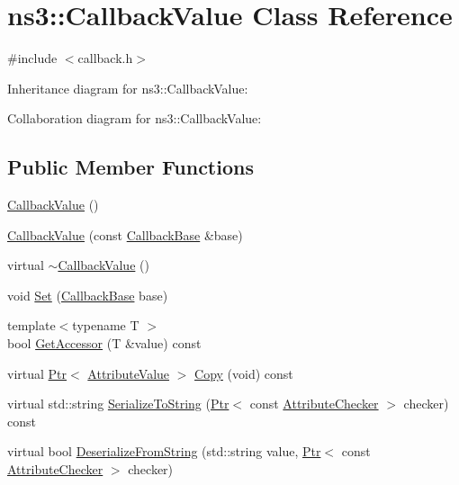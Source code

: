 \hypertarget{classns3_1_1CallbackValue}{}\section{ns3\+:\+:Callback\+Value Class Reference}
\label{classns3_1_1CallbackValue}


{\ttfamily \#include $<$callback.\+h$>$}



Inheritance diagram for ns3\+:\+:Callback\+Value\+:


Collaboration diagram for ns3\+:\+:Callback\+Value\+:
\subsection*{Public Member Functions}
\begin{DoxyCompactItemize}
\item 
\hyperlink{classns3_1_1CallbackValue_a7c4de477fc1d87150302ecbac49e47f8}{Callback\+Value} ()
\item 
\hyperlink{classns3_1_1CallbackValue_af14c204e8277d802245b3c29e536eb5b}{Callback\+Value} (const \hyperlink{classns3_1_1CallbackBase}{Callback\+Base} \&base)
\item 
virtual \hyperlink{classns3_1_1CallbackValue_a95eeb402df7420ad202582a44fc84e48}{$\sim$\+Callback\+Value} ()
\item 
void \hyperlink{classns3_1_1CallbackValue_a75ed6d38fa72d536ac6a25eb9a1f3190}{Set} (\hyperlink{classns3_1_1CallbackBase}{Callback\+Base} base)
\item 
{\footnotesize template$<$typename T $>$ }\\bool \hyperlink{classns3_1_1CallbackValue_a32909bf106160643890d80a998610bc4}{Get\+Accessor} (T \&value) const 
\item 
virtual \hyperlink{classns3_1_1Ptr}{Ptr}$<$ \hyperlink{classns3_1_1AttributeValue}{Attribute\+Value} $>$ \hyperlink{classns3_1_1CallbackValue_af923c18660fba94bcab4bea0e5353ad4}{Copy} (void) const 
\item 
virtual std\+::string \hyperlink{classns3_1_1CallbackValue_a516e948ae9c0850a5c3319a497b06170}{Serialize\+To\+String} (\hyperlink{classns3_1_1Ptr}{Ptr}$<$ const \hyperlink{classns3_1_1AttributeChecker}{Attribute\+Checker} $>$ checker) const 
\item 
virtual bool \hyperlink{classns3_1_1CallbackValue_ac89279c43750267afd50c730c01dcf26}{Deserialize\+From\+String} (std\+::string value, \hyperlink{classns3_1_1Ptr}{Ptr}$<$ const \hyperlink{classns3_1_1AttributeChecker}{Attribute\+Checker} $>$ checker)
\end{DoxyCompactItemize}
